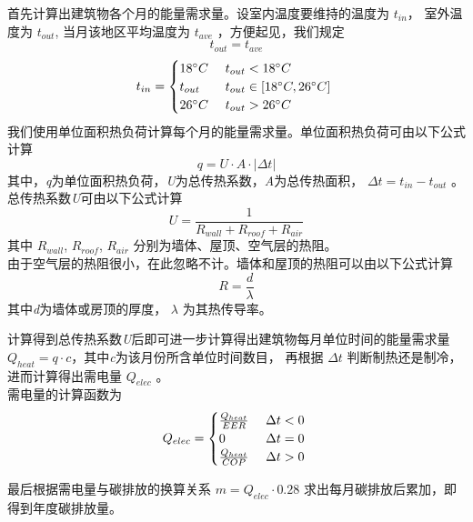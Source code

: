 \documentclass[a4paper, 12pt]{article}
\numberwithin{equation}{section}
\begin{document}
            首先计算出建筑物各个月的能量需求量。设室内温度要维持的温度为 $ t_{in} $， 室外温度为 $ t_{out} $,
            当月该地区平均温度为 $ t_{ave} $ ，方便起见，我们规定
            \begin{equation*}
                t_{out} = t_{ave}
            \end{equation*}
            \begin{equation*}
                t_{in} =
                \begin{cases}
                    18 ^{\circ}C & \text{ $ t_{out} < 18 ^{\circ}C $ } \\
                    t_{out} & \text{ $ t_{out} \in [18 ^{\circ}C, 26 ^{\circ}C] $ } \\
                    26 ^{\circ}C & \text{ $ t_{out} > 26 ^{\circ}C $}
                \end{cases}
            \end{equation*}
            我们使用单位面积热负荷计算每个月的能量需求量。单位面积热负荷可由以下公式计算
            \begin{equation}
                q = U \cdot A \cdot |\Delta t|
            \end{equation}
            其中，\textit{q}为单位面积热负荷，\textit{U}为总传热系数，\textit{A}为总传热面积， $ \Delta t = t_{in} - t_{out} $ 。\\
            总传热系数\textit{U}可由以下公式计算
            \begin{equation}
                U = \frac{1}{R_{wall} + R_{roof} + R_{air}}
            \end{equation}
            其中 $ R_{wall} $, $ R_{roof} $, $ R_{air} $ 分别为墙体、屋顶、空气层的热阻。 \\
            由于空气层的热阻很小，在此忽略不计。墙体和屋顶的热阻可以由以下公式计算
            \begin{equation}
                R = \frac{d}{\lambda}
            \end{equation}
            其中\textit{d}为墙体或房顶的厚度， $ \lambda $ 为其热传导率。

            计算得到总传热系数\textit{U}后即可进一步计算得出建筑物每月单位时间的能量需求量 $ Q_{heat} = q \cdot c $，其中\textit{c}为该月份所含单位时间数目，
            再根据 $ \Delta t $ 判断制热还是制冷，进而计算得出需电量 $ Q_{elec} $ 。 \\
            需电量的计算函数为
            \begin{equation}
                Q_{elec} =
                \begin{cases}
                    \frac{Q_{heat}}{EER} & \text{ $ \Delta t < 0 $ } \\
                    0 & \text{ $ \Delta t = 0 $ } \\
                    \frac{Q_{heat}}{COP} & \text{ $ \Delta t > 0 $ }
                \end{cases}
            \end{equation}

            最后根据需电量与碳排放的换算关系 $ m = Q_{elec} \cdot 0.28 $ 求出每月碳排放后累加，即得到年度碳排放量。
\end{document}

